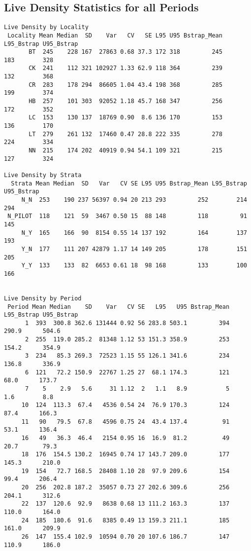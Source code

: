 \documentclass[
]{article}
\begin{document}
\hypertarget{live-density-statistics-for-all-periods}{%
\subsection{Live Density Statistics for all
Periods}\label{live-density-statistics-for-all-periods}}

\begin{verbatim}
Live Density by Locality
 Locality Mean Median  SD    Var   CV   SE L95 U95 Bstrap_Mean L95_Bstrap U95_Bstrap
       BT  245    228 167  27863 0.68 37.3 172 318         245        183        328
       CK  241    112 321 102927 1.33 62.9 118 364         239        132        368
       CR  283    178 294  86605 1.04 43.4 198 368         285        199        374
       HB  257    101 303  92052 1.18 45.7 168 347         256        172        352
       LC  153    130 137  18769 0.90  8.6 136 170         153        136        170
       LT  279    261 132  17460 0.47 28.8 222 335         278        224        334
       NN  215    174 202  40919 0.94 54.1 109 321         215        127        324

Live Density by Strata
  Strata Mean Median  SD   Var   CV SE L95 U95 Bstrap_Mean L95_Bstrap U95_Bstrap
     N_N  253    190 237 56397 0.94 20 213 293         252        214        294
 N_PILOT  118    121  59  3467 0.50 15  88 148         118         91        145
     N_Y  165    166  90  8154 0.55 14 137 192         164        137        193
     Y_N  177    111 207 42879 1.17 14 149 205         178        151        205
     Y_Y  133    133  82  6653 0.61 18  98 168         133        100        166


Live Density by Period
 Period Mean Median    SD    Var   CV SE   L95   U95 Bstrap_Mean L95_Bstrap U95_Bstrap
      1  393  300.8 362.6 131444 0.92 56 283.8 503.1         394      290.9      504.6
      2  255  119.0 285.2  81348 1.12 53 151.3 358.9         253      154.2      354.9
      3  234   85.3 269.3  72523 1.15 55 126.1 341.6         234      136.8      336.9
      6  121   72.2 150.9  22767 1.25 27  68.1 174.3         121       68.0      173.7
      7    5    2.9   5.6     31 1.12  2   1.1   8.9           5        1.6        8.8
     10  124  113.3  67.4   4536 0.54 24  76.9 170.3         124       87.4      166.3
     11   90   79.5  67.8   4596 0.75 24  43.4 137.4          91       53.1      136.4
     16   49   36.3  46.4   2154 0.95 16  16.9  81.2          49       20.7       79.3
     18  176  154.5 130.2  16945 0.74 17 143.7 209.0         177      145.3      210.0
     19  154   72.7 168.5  28408 1.10 28  97.9 209.6         154       99.4      206.4
     20  256  202.8 187.2  35057 0.73 27 202.6 309.6         256      204.1      312.6
     22  137  120.6  92.9   8638 0.68 13 111.2 163.3         137      110.0      164.0
     24  185  180.6  91.6   8385 0.49 13 159.3 211.1         185      161.0      209.9
     26  147  155.4 102.9  10594 0.70 20 107.6 186.7         147      110.9      186.0
\end{verbatim}
\end{document}
